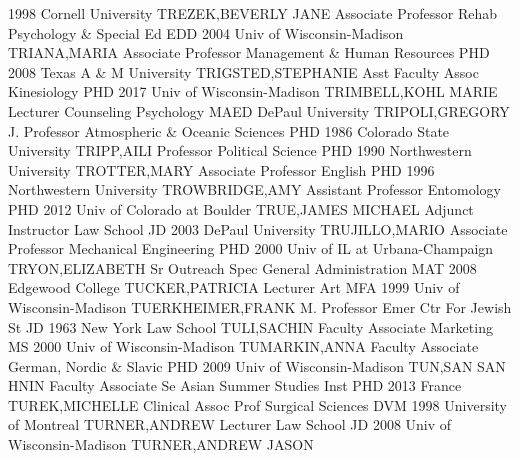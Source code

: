 \documentclass[
]{article}
\begin{document}
1998 Cornell University \textbar TREZEK,BEVERLY JANE \textbar{}
 \textbar Associate Professor \textbar Rehab Psychology \&
Special Ed \textbar EDD 2004 Univ of Wisconsin-Madison
\textbar TRIANA,MARIA \textbar{}  \textbar Associate
Professor \textbar Management \& Human Resources \textbar PHD 2008 Texas
A \& M University \textbar TRIGSTED,STEPHANIE \textbar{} 
\textbar Asst Faculty Assoc \textbar Kinesiology \textbar PHD 2017 Univ
of Wisconsin-Madison \textbar TRIMBELL,KOHL MARIE \textbar{}
 \textbar Lecturer \textbar Counseling Psychology
\textbar MAED DePaul University \textbar TRIPOLI,GREGORY J. \textbar{}
 \textbar Professor \textbar Atmospheric \& Oceanic Sciences
\textbar PHD 1986 Colorado State University \textbar TRIPP,AILI
\textbar{}  \textbar Professor \textbar Political Science
\textbar PHD 1990 Northwestern University \textbar TROTTER,MARY
\textbar{}  \textbar Associate Professor \textbar English
\textbar PHD 1996 Northwestern University \textbar TROWBRIDGE,AMY
\textbar{}  \textbar Assistant Professor \textbar Entomology
\textbar PHD 2012 Univ of Colorado at Boulder \textbar TRUE,JAMES
MICHAEL \textbar{}  \textbar Adjunct Instructor \textbar Law
School \textbar JD 2003 DePaul University \textbar TRUJILLO,MARIO
\textbar{}  \textbar Associate Professor \textbar Mechanical
Engineering \textbar PHD 2000 Univ of IL at Urbana-Champaign
\textbar TRYON,ELIZABETH \textbar{}  \textbar Sr Outreach
Spec \textbar General Administration \textbar MAT 2008 Edgewood College
\textbar TUCKER,PATRICIA \textbar{}  \textbar Lecturer
\textbar Art \textbar MFA 1999 Univ of Wisconsin-Madison
\textbar TUERKHEIMER,FRANK M. \textbar{}  \textbar Professor
Emer \textbar Ctr For Jewish St \textbar JD 1963 New York Law School
\textbar TULI,SACHIN \textbar{}  \textbar Faculty Associate
\textbar Marketing \textbar MS 2000 Univ of Wisconsin-Madison
\textbar TUMARKIN,ANNA \textbar{}  \textbar Faculty
Associate \textbar German, Nordic \& Slavic \textbar PHD 2009 Univ of
Wisconsin-Madison \textbar TUN,SAN SAN HNIN \textbar{} 
\textbar Faculty Associate \textbar Se Asian Summer Studies Inst
\textbar PHD 2013 France \textbar TUREK,MICHELLE \textbar{} 
\textbar Clinical Assoc Prof \textbar Surgical Sciences \textbar DVM
1998 University of Montreal \textbar TURNER,ANDREW \textbar{}
 \textbar Lecturer \textbar Law School \textbar JD 2008 Univ
of Wisconsin-Madison \textbar TURNER,ANDREW JASON \textbar{}
\end{document}
